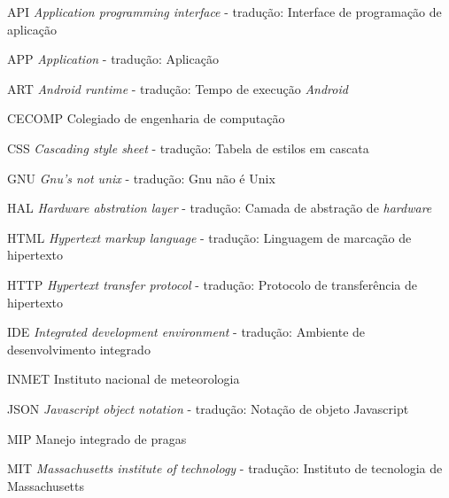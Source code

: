 \begin{KeepFromToc}
\listoffigures
\cleardoublepage


\listoftables
\cleardoublepage

\makeatletter
\let\l@listing\l@figure
\def\newfloat@listoflisting@hook{\let\figurename\listingname}
\makeatother

\listoflistings

\end{KeepFromToc}
\begin{siglas}
	\item[API]      \textit{Application programming interface} - tradução: Interface de programação de aplicação
    \item[APP]		\textit{Application} - tradução: Aplicação
	\item[ART]      \textit{Android runtime} - tradução: Tempo de execução \textit{Android}
	\item[CECOMP]	Colegiado de engenharia de computação
	\item[CSS]      \textit{Cascading style sheet} - tradução: Tabela de estilos em cascata
    \item[GNU]		\textit{Gnu's not unix} - tradução: Gnu não é Unix
	\item[HAL]      \textit{Hardware abstration layer} - tradução: Camada de abstração de \textit{hardware} 
	\item[HTML]     \textit{Hypertext markup language} - tradução: Linguagem  de marcação de hipertexto
	\item[HTTP]     \textit{Hypertext transfer protocol} - tradução: Protocolo de transferência de hipertexto
	\item[IDE]      \textit{Integrated development environment} - tradução: Ambiente de desenvolvimento integrado
	\item[INMET]	Instituto nacional de meteorologia
    \item[JSON]	    \textit{Javascript object notation} - tradução: Notação de objeto Javascript
	\item[MIP]      Manejo integrado de pragas
    \item[MIT]		\textit{Massachusetts institute of technology} - tradução: Instituto de tecnologia de Massachusetts

\end{siglas}
